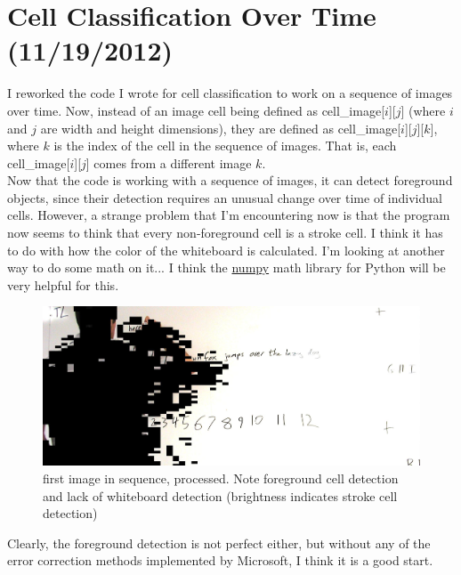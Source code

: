 \documentclass[]{article}
\begin{document}
	\section{Cell Classification Over Time (11/19/2012)}
		I reworked the code I wrote for cell classification to work on a sequence of images over time.  Now, instead of an image cell being defined as cell\_image[$i$][$j$] (where $i$ and $j$ are width and height dimensions), they are defined as cell\_image[$i$][$j$][$k$], where $k$ is the index of the cell in the sequence of images.  That is, each cell\_image[$i$][$j$] comes from a different image $k$.  \\ 
		
		Now that the code is working with a sequence of images, it can detect foreground objects, since their detection requires an unusual change over time of individual cells.  However, a strange problem that I'm encountering now is that the program now seems to think that every non-foreground cell is a stroke cell.  I think it has to do with how the color of the whiteboard is calculated. I'm looking at another way to do some math on it... I think the \href{http://numpy.scipy.org/}{numpy} math library for Python will be very helpful for this. 
		
\begin{figure}[H]
\centering
\includegraphics[scale=0.3]{images/allstrokecells}
\caption{first image in sequence, processed. Note foreground cell detection and lack of whiteboard detection (brightness indicates stroke cell detection)}
\end{figure}
		
		Clearly, the foreground detection is not perfect either, but without any of the error correction methods implemented by Microsoft, I think it is a good start.
\end{document}
